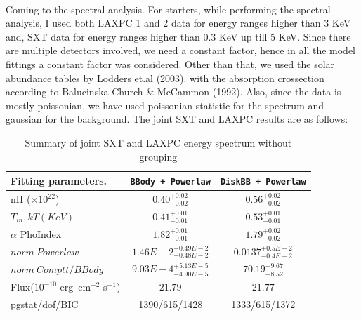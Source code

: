 \documentclass[a4paper,twoside]{report}
\numberwithin{equation}{section}
\begin{document}
\paragraph{}
Coming to the spectral analysis. For starters, while performing the spectral analysis, I used both LAXPC 1 and 2 data for energy ranges higher than 3 KeV and, SXT data for energy ranges higher than 0.3 KeV up till 5 KeV. Since there are multiple detectors involved, we need a constant factor, hence in all the model fittings a constant factor was considered. Other than that, we used the solar abundance tables by Lodders et.al (2003). with the absorption crossection according to Balucinska-Church \& McCammon (1992). Also, since the data is mostly poissonian, we have used poissonian statistic for the spectrum and gaussian for the background. The joint SXT and LAXPC results are as follows:
\begin{table}
\begin{small}
\caption{Summary of joint SXT and LAXPC energy spectrum without grouping}
\label{tab:spec_sxt_laxpc_3-25KeV_1}
\begin{center}
\begin{tabular}{p{3cm}cc}
\hline \hline
Fitting parameters.                             & \texttt{BBody + Powerlaw}           & \texttt{DiskBB + Powerlaw}       \\ \hline \hline
nH ($\times 10^{22}$)                           & $0.40_{-0.02}^{+0.02}$            &$0.56_{-0.02}^{+0.02}$          \\
$T_{in}, kT (KeV)$                              & $0.41_{-0.01}^{+0.01}$            &$0.53_{-0.01}^{+0.01}$         \\
$\alpha$ PhoIndex                               & $1.82_{-0.01}^{+0.01}$            &$1.79_{-0.02}^{+0.02}$         \\\hline
$norm \ Powerlaw$                                 & $1.46E-2_{-0.48E-2}^{-0.49E-2}$   &$0.0137_{-0.4E-2}^{+0.5E-2}$        \\ \hline
$norm \ Comptt/BBody$                             & $9.03E-4_{-4.90E-5}^{+5.13E-5}$   &$70.19_{-8.52}^{+9.67}$    \\ \hline
Flux($10^{-10}$ erg~cm$^{-2}$ s$^{-1}$)        & $21.79$                           &$21.77$                       \\
\hline \hline
pgstat/dof/BIC                                  &  1390/615/1428                    & 1333/615/1372               \\
\hline \hline
\end{tabular}
\end{center}
\end{small}
\end{table}
\end{document}
